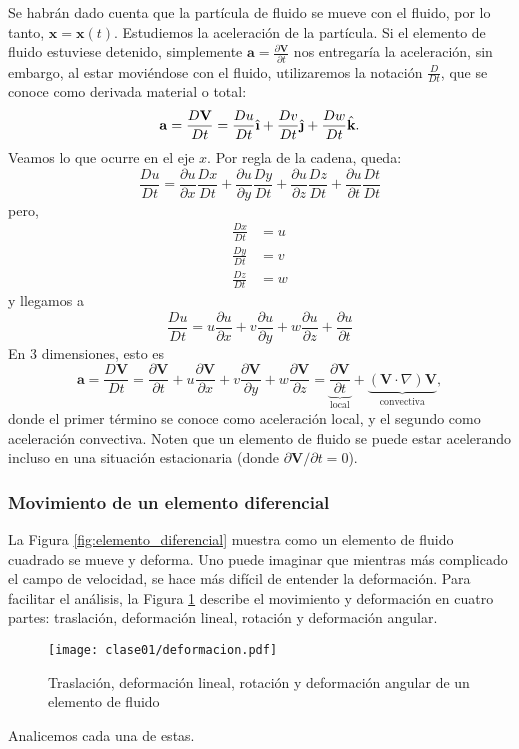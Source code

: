 Se habrán dado cuenta que la partícula de fluido se mueve con el fluido, por lo tanto, $\mathbf{x}=\mathbf{x}(t)$. 
Estudiemos la aceleración de la partícula.
Si el elemento de fluido estuviese detenido, simplemente $\mathbf{a}=\frac{\partial \mathbf{V}}{\partial t}$ nos entregaría la aceleración, sin embargo, al estar moviéndose con el fluido, utilizaremos la notación $\frac{D}{Dt}$, que se conoce como derivada material o total:
%
\begin{equation}\label{eq:acel}
\mathbf{a} = \frac{D\mathbf{V}}{Dt} = \frac{Du}{Dt}\ihat+\frac{Dv}{Dt}\jhat+\frac{Dw}{Dt}\khat.
\end{equation}
%
Veamos lo que ocurre en el eje $x$. 
Por regla de la cadena, queda:
%
\begin{equation}
\frac{Du}{Dt} = \frac{\partial u}{\partial x}\frac{Dx}{Dt} +\frac{\partial u}{\partial y}\frac{Dy}{Dt} +\frac{\partial u}{\partial z}\frac{Dz}{Dt}+ \frac{\partial u}{\partial t}\frac{Dt}{Dt}
\end{equation}
%
pero,
\begin{align}
\frac{Dx}{Dt} &= u \nonumber\\
\frac{Dy}{Dt} &= v \nonumber\\
\frac{Dz}{Dt} &= w 
\end{align}
%
y llegamos a
%
\begin{equation}
\frac{Du}{Dt} = u\frac{\partial u}{\partial x} + v\frac{\partial u}{\partial y} + w\frac{\partial u}{\partial z} + \frac{\partial u}{\partial t}
\end{equation}
%
En 3 dimensiones, esto es
%
\begin{equation}
\mathbf{a} = \frac{D\mathbf{V}}{Dt} = \frac{\partial \mathbf{V}}{\partial t} + u\frac{\partial \mathbf{V}}{\partial x} + v\frac{\partial \mathbf{V}}{\partial y} + w\frac{\partial \mathbf{V}}{\partial z} = \underbrace{\frac{\partial \mathbf{V}}{\partial t}}_\text{local} + \underbrace{(\mathbf{V}\cdot\nabla)\mathbf{V}}_\text{convectiva},
\end{equation}
%
donde el primer término se conoce como aceleración local, y el segundo como aceleración convectiva.
Noten que un elemento de fluido se puede estar acelerando incluso en una situación estacionaria (donde $\partial \mathbf{V}/\partial t=0$).

\subsubsection*{Movimiento de un elemento diferencial}
La Figura \ref{fig:elemento_diferencial} muestra como un elemento de fluido cuadrado se mueve y deforma. 
Uno puede imaginar que mientras más complicado el campo de velocidad, se hace más difícil de entender la deformación.
Para facilitar el análisis, la Figura \ref{fig:deformacion} describe el movimiento y deformación en cuatro partes: traslación, deformación lineal, rotación y deformación angular.
%
\begin{figure}[h!]
\centering
\texttt{[image: clase01/deformacion.pdf]}
\caption{Traslación, deformación lineal, rotación y deformación angular de un elemento de fluido}
\label{fig:deformacion}
\end{figure}
%
Analicemos cada una de estas.

